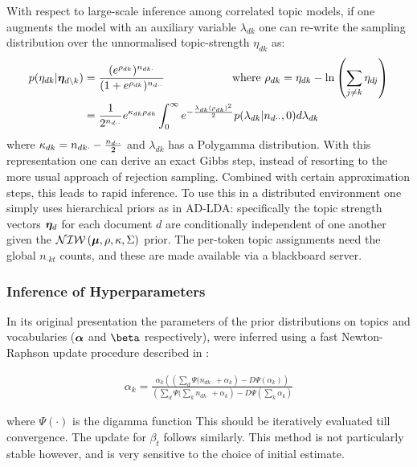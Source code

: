 With respect to large-scale inference among correlated topic models, if one augments the model with an auxiliary variable $\lambda_{dk}$ one can re-write the sampling distribution over the unnormalised topic-strength $\eta_{dk}$ as:
\begin{align}
p(\eta_{dk} | \bm \eta_{d\setminus k}) & = \frac{(e^{\rho_{dk}})^{n_{dk\cdot}}}{(1 + e^{\rho_{dk}})^{n_{d\cdot\cdot}}} \qquad\qquad\qquad\text{where }\rho_{dk} = \eta_{dk} - \ln\left(\sum_{j \neq k} \eta_{dj}\right) \\
&= \frac{1}{2^{n_{d\cdot\cdot}}}
e^{\kappa_{dk} \rho_{dk}}
\int_0^\infty e^{-\frac{\lambda_{dk} (\rho_{dk})^2}{2}} p(\lambda_{dk}|n_{d\cdot\cdot},0) d\lambda_{dk} 
\end{align}
where $\kappa_{dk} = n_{dk\cdot} - \frac{n_{d\cdot\cdot}}{2}$ and $\lambda_{dk}$ has a Polygamma distribution. With this representation one can derive an exact Gibbs step, instead of resorting to the more usual approach of rejection sampling. Combined with certain approximation steps, this leads to rapid inference\cite{Chen2013}. To use this in a distributed environment one simply uses hierarchical priors as in AD-LDA: specifically the topic strength vectors $\bm \eta_d$ for each document $d$ are conditionally independent of one another given the $\mathcal{NIW}\left(\bm \mu, \rho, \kappa, \Sigma\right)$ prior. The per-token topic assignments need the global $n_{\cdot k t}$ counts, and these are made available via a blackboard server.

\subsubsection*{Inference of Hyperparameters}
In its original presentation\cite{BleiNgJordan2003} the parameters of the prior distributions on topics and vocabularies ($\bm \alpha$ and $\vv{\beta}$ respectively), were inferred using a fast Newton-Raphson update procedure described in \cite{Minka2000}:

\begin{align}
\alpha_k = \frac{\alpha_k \left( \left(\sum_d \Psi(n_{dk\cdot} + \alpha_k \right) - D \Psi (\alpha_k)\right)}{\left(\sum_d  \Psi(\sum_k n_{dk\cdot} + \alpha_k \right) - D \Psi (\sum_k \alpha_k)}
\end{align}

where $\Psi(\cdot)$ is the digamma function This should be iteratively evaluated till convergence. The update for $\beta_t$ follows similarly. This method is not particularly stable however, and is very sensitive to the choice of initial estimate.

